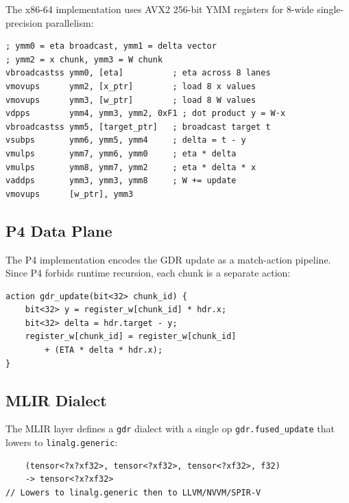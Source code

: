 \documentclass[10pt,conference]{IEEEtran}
\begin{document}
The x86-64 implementation uses AVX2 256-bit YMM registers for 8-wide
single-precision parallelism:

\begin{lstlisting}[style=nasm,caption={x86-64 NASM GDR update (excerpt)}]
; ymm0 = eta broadcast, ymm1 = delta vector
; ymm2 = x chunk, ymm3 = W chunk
vbroadcastss ymm0, [eta]          ; eta across 8 lanes
vmovups      ymm2, [x_ptr]        ; load 8 x values
vmovups      ymm3, [w_ptr]        ; load 8 W values
vdpps        ymm4, ymm3, ymm2, 0xF1 ; dot product y = W·x
vbroadcastss ymm5, [target_ptr]   ; broadcast target t
vsubps       ymm6, ymm5, ymm4     ; delta = t - y
vmulps       ymm7, ymm6, ymm0     ; eta * delta
vmulps       ymm8, ymm7, ymm2     ; eta * delta * x
vaddps       ymm3, ymm3, ymm8     ; W += update
vmovups      [w_ptr], ymm3
\end{lstlisting}

\subsection{P4 Data Plane}

The P4 implementation encodes the GDR update as a match-action pipeline.
Since P4 forbids runtime recursion, each chunk is a separate action:

\begin{lstlisting}[style=cuda,caption={P4 GDR action (schematic)}]
action gdr_update(bit<32> chunk_id) {
    bit<32> y = register_w[chunk_id] * hdr.x;
    bit<32> delta = hdr.target - y;
    register_w[chunk_id] = register_w[chunk_id]
        + (ETA * delta * hdr.x);
}
\end{lstlisting}

\subsection{MLIR Dialect}

The MLIR layer defines a \texttt{gdr} dialect with a single op
\texttt{gdr.fused\_update} that lowers to \texttt{linalg.generic}:

\begin{lstlisting}[style=cuda,caption={MLIR GDR dialect (schematic)}]
%delta = gdr.fused_update(%W, %x, %target, %eta) :
    (tensor<?x?xf32>, tensor<?xf32>, tensor<?xf32>, f32)
    -> tensor<?x?xf32>
// Lowers to linalg.generic then to LLVM/NVVM/SPIR-V
\end{lstlisting}

\end{document}
